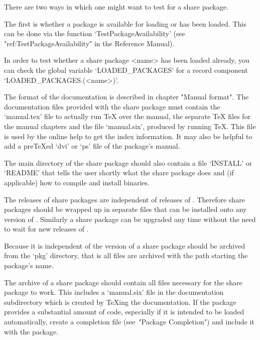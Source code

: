 
There are two ways in which one might want to test for a share package. 

The first is whether a package is available for loading or has been loaded.
This can be done via the function `TestPackageAvailability' (see
"ref:TestPackageAvailability" in the Reference Manual). 

In order to test whether a share package <name> has been loaded already, you
can check the global variable `LOADED_PACKAGES' for a record component
`LOADED_PACKAGES.(<name>)'.


The format of the documentation is described in chapter "Manual format". The
documentation files provided with the share package must contain the
`manual.tex' file to actually run {\TeX} over the manual, the separate
{\TeX} files for the manual chapters and the file `manual.six', produced by
running {\TeX}. This file is used by the online help to get the index
information. It may also be helpful to add a pre{\TeX}ed `dvi' or `ps' file
of the package's manual.

The main directory of the share package should also contain a file `INSTALL'
or `README' that tells the user shortly what the share package does and (if
applicable) how to compile and install binaries.


The releases of share packages are independent of releases of {\GAP}.
Therefore share packages should be wrapped up in separate files that can be
installed onto any version of {\GAP}. Similarly a share package can be
upgraded any time without the need to wait for new releases of {\GAP}.

Because it is independent of the version of {\GAP} a share package should be
archived from the {\GAP} `pkg'  directory, that is all files are archived with
the path starting the package's name.

The archive of a share package should contain all files necessary for the
share package to work. This includes a `manual.six' file in the
documentation subdirectory which is created by {\TeX}ing the documentation.
If the package provides a substantial amount of code,
especially if it is intended to be loaded automatically, create a completion
file (see~"Package Completion") and include it with the package.

